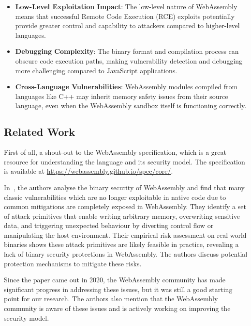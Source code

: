 \documentclass{article}
\begin{document}
\begin{itemize}
    \item \textbf{Low-Level Exploitation Impact}: The low-level nature of WebAssembly means that successful Remote Code Execution (RCE) exploits potentially provide greater control and capability to attackers compared to higher-level languages.
    
    \item \textbf{Debugging Complexity}: The binary format and compilation process can obscure code execution paths, making vulnerability detection and debugging more challenging compared to JavaScript applications.
    
    \item \textbf{Cross-Language Vulnerabilities}: WebAssembly modules compiled from languages like C++ may inherit memory safety issues from their source language, even when the WebAssembly sandbox itself is functioning correctly.
\end{itemize}

\subsection{Related Work}
First of all, a shout-out to the WebAssembly specification, which is a great resource for understanding the language and its security model. The specification is available at \url{https://webassembly.github.io/spec/core/}.

In~\cite{everythingold}, the authors analyse the binary security of WebAssembly and find that many classic vulnerabilities which are no longer exploitable in native code due to common mitigations are completely exposed in WebAssembly. They identify a set of attack primitives that enable writing arbitrary memory, overwriting sensitive data, and triggering unexpected behaviour by diverting control flow or manipulating the host environment. Their empirical risk assessment on real-world binaries shows these attack primitives are likely feasible in practice, revealing a lack of binary security protections in WebAssembly. The authors discuss potential protection mechanisms to mitigate these risks.

Since the paper came out in 2020, the WebAssembly community has made significant progress in addressing these issues, but it was still a good starting point for our research. The authors also mention that the WebAssembly community is aware of these issues and is actively working on improving the security model.
\end{document}
